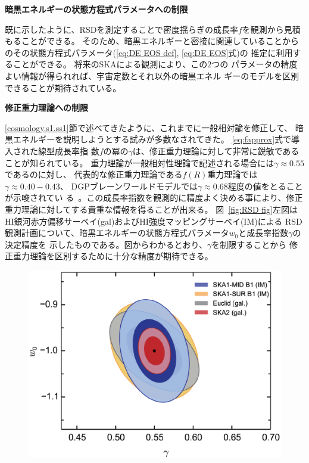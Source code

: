 \begin{description}
\item {\bf 暗黒エネルギーの状態方程式パラメータへの制限}

既に示したように、RSDを測定することで密度揺らぎの成長率$f$を観測から見積もることができる。
そのため、暗黒エネルギーと密接に関連していることからのその状態方程式パラメータ(\eqref{eq:DE EOS def}, \eqref{eq:DE EOS}式)の
推定に利用することができる。
将来のSKAによる観測により、この$2$つの
パラメータの精度よい情報が得られれば、宇宙定数とそれ以外の暗黒エネル
ギーのモデルを区別できることが期待されている。

\item {\bf 修正重力理論への制限}

\ref{cosmology.s1.ss1}節で述べてきたように、これまでに一般相対論を修正して、
暗黒エネルギーを説明しようとする試みが多数なされてきた。
\eqref{eq:fapprox}式で導入された線型成長率指
数$f$の冪の$\gamma$は、修正重力理論に対して非常に鋭敏であることが知られている。
重力理論が一般相対性理論で記述される場合には$\gamma\approx 0.55$であるのに対し、
代表的な修正重力理論である$f(R)$重力理論では$\gamma\approx 0.40-0.43$、
DGPブレーンワールドモデルでは$\gamma\approx 0.68$程度の値をとることが示唆されてい
る~\citep{Linder:2005in}。この成長率指数を観測的に精度よく決める事により、修正
重力理論に対してする貴重な情報を得ることが出来る。
図~\ref{fig:RSD fig}左図はHI銀河赤方偏移サーベイ(gal)およびHI強度マッピングサーベイ(IM)による
RSD観測計画について、暗黒エネルギーの状態方程式パラメータ$w_0$と成長率指数$\gamma$の決定精度を
示したものである。図からわかるとおり、$\gamma$を制限することから
修正重力理論を区別するために十分な精度が期待できる。

\begin{figure}[t]
 \begin{minipage}{0.52\hsize}
 \begin{center}
   \includegraphics[width=1.0\linewidth]{cosmology/Fig3new.eps} 


\end{center}
\end{minipage}
\end{figure}
\end{description}
